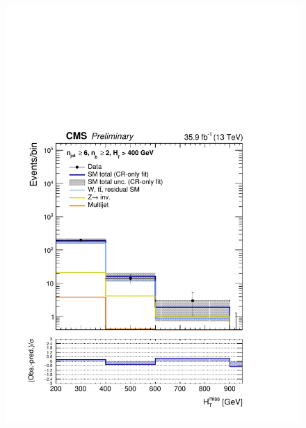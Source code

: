 \begin{figure}[h!]
  \includegraphics[width=0.8\linewidth]{figures/results/36invfb/aggregated/postFitShapeCR/mhtShape_ge2b_ge6j_400_Inf_crfit.pdf}
  \label{fig:aggregated_results}
\end{figure}
